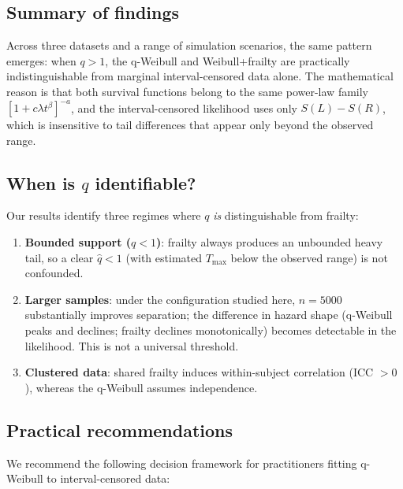 \documentclass[12pt,a4paper]{article}
\begin{document}
\subsection{Summary of findings}

Across three datasets and a range of simulation scenarios, the same pattern emerges: when $q>1$, the q-Weibull and Weibull+frailty are practically indistinguishable from marginal interval-censored data alone. The mathematical reason is that both survival functions belong to the same power-law family $[1+c\lambda t^\beta]^{-a}$, and the interval-censored likelihood uses only $S(L)-S(R)$, which is insensitive to tail differences that appear only beyond the observed range.

\subsection{When is $q$ identifiable?}

Our results identify three regimes where $q$ \emph{is} distinguishable from frailty:
\begin{enumerate}
\item \textbf{Bounded support ($q<1$)}: frailty always produces an unbounded heavy tail, so a clear $\hat q<1$ (with estimated $T_{\max}$ below the observed range) is not confounded.
\item \textbf{Larger samples}: under the configuration studied here, $n=5000$ substantially improves separation; the difference in hazard shape (q-Weibull peaks and declines; frailty declines monotonically) becomes detectable in the likelihood. This is not a universal threshold.
\item \textbf{Clustered data}: shared frailty induces within-subject correlation (ICC $>0$), whereas the q-Weibull assumes independence.
\end{enumerate}

\subsection{Practical recommendations}

We recommend the following decision framework for practitioners fitting q-Weibull to interval-censored data:
\end{document}
